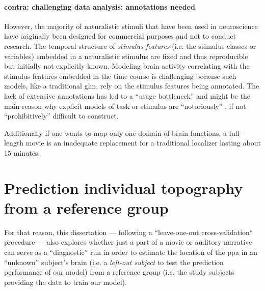 \paragraph{contra: challenging data analysis; annotations needed}

%
However, the majority of naturalistic stimuli that have been used in
neuroscience have originally been designed for commercial purposes and not to
conduct research.
%
The temporal structure of \textit{stimulus features} (i.e. the stimulus classes
or variables) embedded in a naturalistic stimulus are fixed and thus
reproducible but initially not explicitly known.
%
Modeling brain activity correlating with the stimulus features embedded in the
time course is challenging \citep{saarimaki2021naturalistic, simony2020analysis}
because such models, like a traditional \ac{glm}, rely on the stimulus features
being annotated.
%
The lack of extensive annotations has led to a ``usage bottleneck''
\citep{aliko2020naturalistic} and might be the main reason why explicit models
of task or stimulus are ``notoriously'' \citep{richard2019fast}, if not
``prohibitively'' \citep{nastase2019measuring} difficult to construct.

%
Additionally if one wants to map only one domain of brain functions, a
full-length movie is an inadequate replacement for a traditional localizer
lasting about 15 minutes.



\section{Prediction individual topography from a reference group}





%
For that reason, this dissertation --- following a ``leave-one-out
cross-validation`` procedure --- also explores whether just a part of a movie or
auditory narrative can serve as a ``diagnostic'' run in order to estimate the
location of the \ac{ppa} in an ``unknown'' subject's brain (i.e. a
\textit{left-out subject} to test the prediction performance of our model) from
a reference group (i.e. the study subjects providing the data to train our
model).

